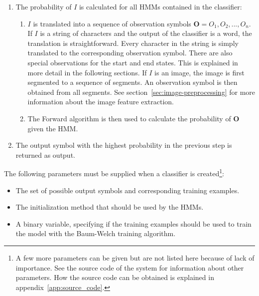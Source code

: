 \begin{enumerate}
  \item The probability of $I$ is calculated for all HMMs contained in the classifier:
    \begin{enumerate}
      \item $I$ is translated into a sequence of observation symbols $\mathbf{O} = O_{1},O_{2},...,O_{n}$. 
      If $I$ is a string of characters and the output of the classifier is a word, the translation is straightforward. 
      Every character in the string is simply translated to the corresponding observation symbol. 
      There are also special observations for the start and end states. 
      This is explained in more detail in the following sections. 
      If $I$ is an image, the image is first segmented to a sequence of segments. 
      An observation symbol is then obtained from all segments. 
      See section~\ref{sec:image-preprocessing} for more information about the image feature extraction.
      \item The Forward algorithm \cite{Rabiner1989} is then used to calculate the probability of $\mathbf{O}$ given the HMM.
    \end{enumerate}
  \item The output symbol with the highest probability in the previous step is returned as output.
\end{enumerate}
 
The following parameters must be supplied when a classifier is created\footnote{A few more parameters can be given but are not listed here because of lack of importance. See the source code of the system for information about other parameters. How the source code can be obtained is explained in appendix~\ref{app:source_code}.}:
\begin{itemize}
 \item The set of possible output symbols and corresponding training examples.
 \item The initialization method that should be used by the HMMs.
 \item A binary variable, specifying if the training examples should be used to train the model with the Baum-Welch \cite{Rabiner1989} training algorithm.
\end{itemize}
